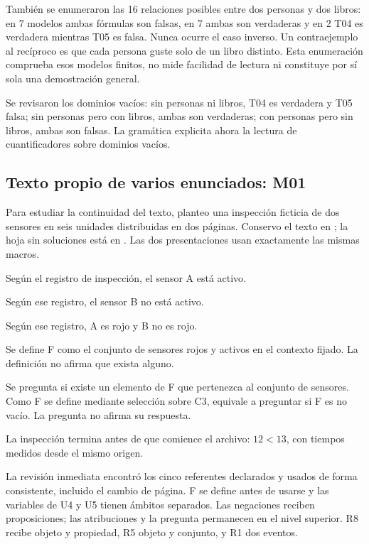 También se enumeraron las 16 relaciones posibles entre dos personas y dos
libros: en 7 modelos ambas fórmulas son falsas, en 7 ambas son verdaderas y en
2 T04 es verdadera mientras T05 es falsa. Nunca ocurre el caso inverso.
Un contraejemplo al recíproco es que cada persona guste solo de un libro
distinto. Esta enumeración comprueba esos modelos finitos, no mide facilidad
de lectura ni constituye por sí sola una demostración general.

Se revisaron los dominios vacíos: sin personas ni libros, T04 es verdadera y
T05 falsa; sin personas pero con libros, ambas son verdaderas; con personas
pero sin libros, ambas son falsas. La gramática explicita ahora la lectura
de cuantificadores sobre dominios vacíos.

\subsection{Texto propio de varios enunciados: M01}
Para estudiar la continuidad del texto, planteo una inspección ficticia de
dos sensores en seis unidades distribuidas en dos páginas. Conservo el texto en
; la hoja sin soluciones está en
. Las dos presentaciones usan exactamente las mismas macros.

\begin{description}[style=nextline]
\item[U1] Según el registro de inspección, el sensor A está activo.
\item[U2] Según ese registro, el sensor B no está activo.
\item[U3] Según ese registro, A es rojo y B no es rojo.
\item[U4] Se define F como el conjunto de sensores rojos y activos en el
contexto fijado. La definición no afirma que exista alguno.
\item[U5] Se pregunta si existe un elemento de F que pertenezca al conjunto
de sensores. Como F se define mediante selección sobre C3, equivale a
preguntar si F es no vacío. La pregunta no afirma su respuesta.
\item[U6] La inspección termina antes de que comience el archivo:
\(12<13\), con tiempos medidos desde el mismo origen.
\end{description}

La revisión inmediata encontró los cinco referentes declarados y usados de
forma consistente, incluido el cambio de página. F se define antes de usarse
y las variables de U4 y U5 tienen ámbitos separados. Las negaciones reciben
proposiciones; las atribuciones y la pregunta permanecen en el nivel superior.
R8 recibe objeto y propiedad, R5 objeto y conjunto, y R1 dos eventos.

